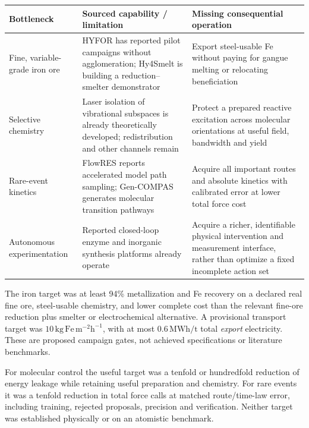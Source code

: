 \documentclass[11pt]{article}
\begin{document}
\begin{center}\small
\begin{tabular}{p{.18\linewidth}p{.36\linewidth}p{.36\linewidth}}
\toprule
Bottleneck & Sourced capability / limitation & Missing consequential operation \\
\midrule
Fine, variable-grade iron ore & HYFOR has reported pilot campaigns without agglomeration; Hy4Smelt is building a reduction--smelter demonstrator & Export steel-usable Fe without paying for gangue melting or relocating beneficiation \\
Selective chemistry & Laser isolation of vibrational subspaces is already theoretically developed; redistribution and other channels remain & Protect a prepared reactive excitation across molecular orientations at useful field, bandwidth and yield \\
Rare-event kinetics & FlowRES reports accelerated model path sampling; Gen-COMPAS generates molecular transition pathways & Acquire all important routes and absolute kinetics with calibrated error at lower total force cost \\
Autonomous experimentation & Reported closed-loop enzyme and inorganic synthesis platforms already operate & Acquire a richer, identifiable physical intervention and measurement interface, rather than optimize a fixed incomplete action set \\
\bottomrule
\end{tabular}
\end{center}

The iron target was at least 94\% metallization and Fe recovery on a declared
real fine ore, steel-usable chemistry, and lower complete cost than the relevant
fine-ore reduction plus smelter or electrochemical alternative. A provisional
transport target was $10\,\mathrm{kg\,Fe\,m^{-2}h^{-1}}$, with at most
$0.6\,\mathrm{MWh/t}$ total \emph{export} electricity. These are proposed
campaign gates, not achieved specifications or literature benchmarks.

For molecular control the useful target was a tenfold or hundredfold reduction
of energy leakage while retaining useful preparation and chemistry. For rare
events it was a tenfold reduction in total force calls at matched route/time-law
error, including training, rejected proposals, precision and verification.
Neither target was established physically or on an atomistic benchmark.
\end{document}

